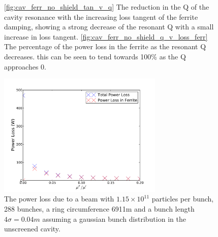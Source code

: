 \begin{figure}
\caption{\ref{fig:cav_ferr_no_shield_tan_v_q} The reduction in the Q of the cavity resonance with the increasing loss tangent of the ferrite damping, showing a strong decrease of the resonant Q with a small increase in loss tangent. \ref{fig:cav_ferr_no_shield_q_v_loss_ferr} The percentage of the power loss in the ferrite as the resonant Q decreases. this can be seen to tend towards 100\% as the Q approaches 0.}
\label{fig:no_screen_res_alterations}
\end{figure}

\begin{figure}
\begin{center}
\includegraphics[width=0.7\textwidth]{Beam_Coupling_Impedance_Reduction_Techniques/figures/no_screen_loss_tan_vs_power.pdf}
\end{center}
\caption{The power loss due to  a beam with $1.15 \times 10^{11}$ particles per bunch, 288 bunches, a ring circumference 6911m and a bunch length $4\sigma = 0.04m$ assuming a gaussian bunch distribution in the unscreened cavity.}
\label{fig:no_screen_loss_tan_v_power}
\end{figure}

